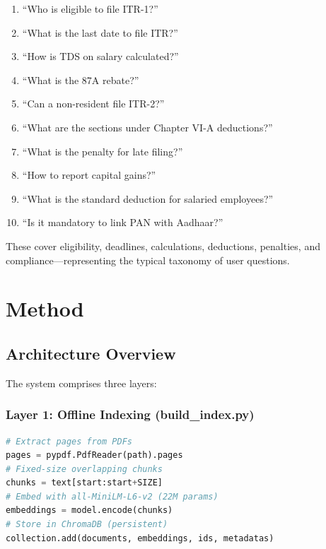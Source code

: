\documentclass[11pt,a4paper]{article}
\begin{document}
\begin{enumerate}
    \item ``Who is eligible to file ITR-1?''
    \item ``What is the last date to file ITR?''
    \item ``How is TDS on salary calculated?''
    \item ``What is the 87A rebate?''
    \item ``Can a non-resident file ITR-2?''
    \item ``What are the sections under Chapter VI-A deductions?''
    \item ``What is the penalty for late filing?''
    \item ``How to report capital gains?''
    \item ``What is the standard deduction for salaried employees?''
    \item ``Is it mandatory to link PAN with Aadhaar?''
\end{enumerate}

These cover eligibility, deadlines, calculations, deductions, penalties, and compliance---representing the typical taxonomy of user questions.

\section{Method}
\label{sec:method}

\subsection{Architecture Overview}

The system comprises three layers:

\subsubsection{Layer 1: Offline Indexing (build\_index.py)}

\begin{lstlisting}[language=Python, caption={Text extraction and chunking pipeline}]
# Extract pages from PDFs
pages = pypdf.PdfReader(path).pages
# Fixed-size overlapping chunks
chunks = text[start:start+SIZE]
# Embed with all-MiniLM-L6-v2 (22M params)
embeddings = model.encode(chunks)
# Store in ChromaDB (persistent)
collection.add(documents, embeddings, ids, metadatas)
\end{lstlisting}
\end{document}

